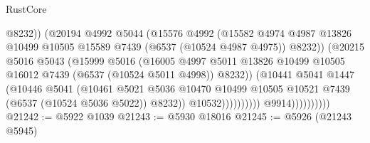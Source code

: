 \begin{lexlean}{RustCore}
\begin{coremodule}
                                          @8232))
                                      (@20194
                                        @4992
                                        @5044
                                        (@15576
                                          @4992
                                          (@15582
                                            @4974
                                            @4987
                                            @13826
                                            @10499
                                            @10505
                                            @15589
                                            @7439
                                            (@6537 (@10524 @4987 @4975))
                                            @8232))
                                        (@20215
                                          @5016
                                          @5043
                                          (@15999
                                            @5016
                                            (@16005
                                              @4997
                                              @5011
                                              @13826
                                              @10499
                                              @10505
                                              @16012
                                              @7439
                                              (@6537 (@10524 @5011 @4998))
                                              @8232))
                                          (@10441
                                            @5041
                                            @1447
                                            (@10446
                                              @5041
                                              (@10461
                                                @5021
                                                @5036
                                                @10470
                                                @10499
                                                @10505
                                                @10521
                                                @7439
                                                (@6537 (@10524 @5036 @5022))
                                                @8232))
                                            @10532))))))))))
                        @9914))))))))))
@21242 := @5922 @1039
@21243 := @5930 @18016
@21245 := @5926 (@21243 @5945)

\end{coremodule}
\end{lexlean}
